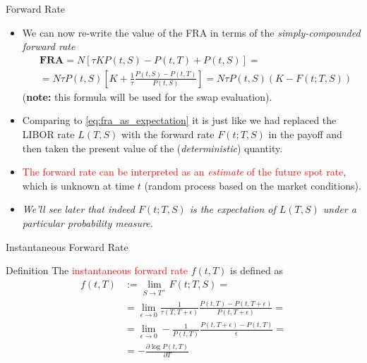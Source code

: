 \documentclass{beamer}
\begin{document}
\begin{frame}{Forward Rate}
	\begin{itemize}
		\item We can now re-write the value of the FRA in terms of the \emph{simply-compounded forward rate}
		\begin{equation}
			\begin{aligned}
			&\textbf{FRA}=N[\tau KP(t,S)-P(t,T)+P(t,S)] = \\
			&=N\tau P(t,S) \left[K +\frac{1}{\tau} \frac{P(t,S)-P(t,T)}{P(t,S)}\right] = N\tau P(t,S)(K-F(t;T,S))
			\end{aligned}
			\label{eq:fram_payoff_withF}
		\end{equation}
		(\textbf{note:} this formula will be used for the swap evaluation).
		\item<2-> Comparing to \cref{eq:fra_as_expectation} it is just like we had replaced the LIBOR rate $L(T,S)$ with the forward rate $F(t;T,S)$ in the payoff and then taken the present value of the (\emph{deterministic}) quantity.
		\item<3-> \textcolor{red}{The forward rate can be interpreted as an \emph{estimate} of the future spot rate}, which is unknown at time $t$ (random process based on the market conditions).
		\item<3-> \emph{We'll see later that indeed $F(t;T,S)$ is the expectation of $L(T,S)$ under a particular probability measure.}
	\end{itemize}
\end{frame}

\begin{frame}{Instantaneous Forward Rate}
	\begin{block}{Definition}
	The \textcolor{red}{instantaneous forward rate} $f(t, T)$ is defined as 
	\begin{equation}
		\begin{aligned}
			f(t, T) &:= \lim_{S\rightarrow T^+} F(t;T,S) =\\
			& = \lim_{\epsilon\rightarrow 0}  \frac{1}{\tau(T,T+\epsilon)}\frac{P(t,T)-P(t,T+\epsilon)}{P(t,T+\epsilon)} = \\
			& = \lim_{\epsilon\rightarrow 0} - \frac{1}{P(t,T)} \frac{P(t,T+\epsilon)-P(t,T)}{\epsilon} =\\
			& = -\frac{\partial \log P(t, T)}{\partial T}
		\end{aligned}
	\end{equation}
\myendproof
	\end{block}
\end{frame}
\end{document}
